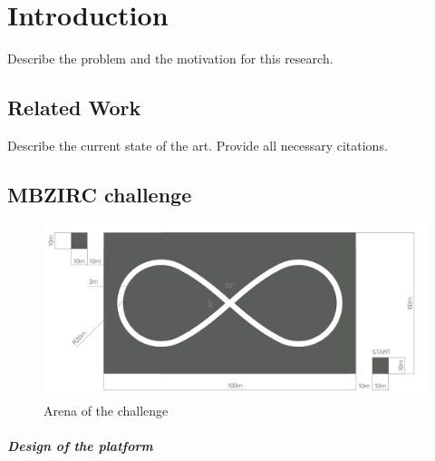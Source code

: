 \chapter{Introduction}\label{chap:introduction}

Describe the problem and the motivation for this research.
\\
\section{Related Work}\label{sec:related_work}

Describe the current state of the art. Provide all necessary citations.



\section{MBZIRC challenge}


\begin{figure}[!htbp]
    \centering
    \includegraphics[width=1.1\textwidth]{img/arena.png}
    \caption{Arena of the challenge}
    \label{fig:arenachallenge}
\end{figure}

\paragraph{Design of the platform}


